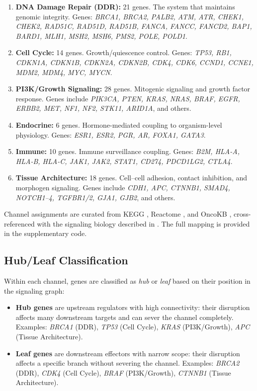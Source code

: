\documentclass[11pt]{article}
\begin{document}
\begin{enumerate}
\item \textbf{DNA Damage Repair (DDR):} 21 genes. The system
   that maintains genomic integrity. Genes: \emph{BRCA1, BRCA2,
   PALB2, ATM, ATR, CHEK1, CHEK2, RAD51C, RAD51D, RAD51B,
   FANCA, FANCC, FANCD2, BAP1, BARD1, MLH1, MSH2, MSH6, PMS2,
   POLE, POLD1}.
\item \textbf{Cell Cycle:} 14 genes. Growth/quiescence control.
   Genes: \emph{TP53, RB1, CDKN1A, CDKN1B, CDKN2A, CDKN2B,
   CDK4, CDK6, CCND1, CCNE1, MDM2, MDM4, MYC, MYCN}.
\item \textbf{PI3K/Growth Signaling:} 28 genes. Mitogenic
   signaling and growth factor response. Genes include
   \emph{PIK3CA, PTEN, KRAS, NRAS, BRAF, EGFR, ERBB2, MET,
   NF1, NF2, STK11, ARID1A}, and others.
\item \textbf{Endocrine:} 6 genes. Hormone-mediated coupling to
   organism-level physiology. Genes: \emph{ESR1, ESR2, PGR, AR,
   FOXA1, GATA3}.
\item \textbf{Immune:} 10 genes. Immune surveillance coupling.
   Genes: \emph{B2M, HLA-A, HLA-B, HLA-C, JAK1, JAK2, STAT1,
   CD274, PDCD1LG2, CTLA4}.
\item \textbf{Tissue Architecture:} 18 genes. Cell--cell adhesion,
   contact inhibition, and morphogen signaling. Genes include
   \emph{CDH1, APC, CTNNB1, SMAD4, NOTCH1--4, TGFBR1/2, GJA1,
   GJB2}, and others.
\end{enumerate}

Channel assignments are curated from KEGG \cite{Kanehisa2000},
Reactome \cite{Jassal2020}, and OncoKB \cite{Chakravarty2017},
cross-referenced with the signaling biology described in
\cite{McCarthy2026e}. The full mapping is provided in the
supplementary code.

\subsection{Hub/Leaf Classification}

Within each channel, genes are classified as \emph{hub} or
\emph{leaf} based on their position in the signaling graph:

\begin{itemize}
\item \textbf{Hub genes} are upstream regulators with high
   connectivity: their disruption affects many downstream targets
   and can sever the channel completely. Examples: \emph{BRCA1}
   (DDR), \emph{TP53} (Cell Cycle), \emph{KRAS} (PI3K/Growth),
   \emph{APC} (Tissue Architecture).
\item \textbf{Leaf genes} are downstream effectors with narrow
   scope: their disruption affects a specific branch without
   severing the channel. Examples: \emph{BRCA2} (DDR),
   \emph{CDK4} (Cell Cycle), \emph{BRAF} (PI3K/Growth),
   \emph{CTNNB1} (Tissue Architecture).
\end{itemize}
\end{document}
